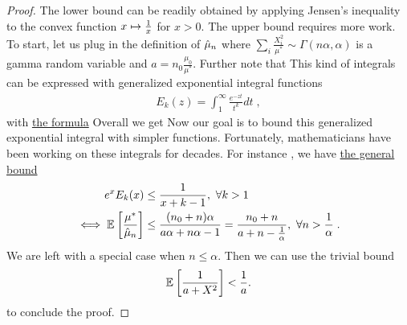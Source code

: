 \begin{proof}
	The lower bound can be readily obtained by applying Jensen's inequality 
	to the convex function $x\mapsto\frac{1}{x}$ for $x>0$.
	The upper bound requires more work.
	To start, let us plug in the definition of $\hat {\mu}_n$
	where  $\sum_i \frac{X_i^2}{ \mu^*} \sim \Gamma(n\alpha, \alpha)$ is a gamma random variable and $a=n_0 \frac{\mu_0}{\mu^*}$. 
	Further note that 
This kind of integrals can be expressed with {generalized exponential integral functions}
	\begin{align}
		E_k(z) = \int_1^\infty \frac{e^{-z t} }{t^k} dt \; ,
	\end{align}
with \href{http://dlmf.nist.gov/8.19.E4}{the formula} \citep[Eq.~8.19.4]{DLMF}
Overall we get
	Now our goal is to bound this generalized exponential integral with simpler functions.
	Fortunately, mathematicians have been working on these integrals for decades.
	For instance , we have \href{https://dlmf.nist.gov/8.19.E21}{the general bound} \citep[Eq.~8.19.21]{DLMF}
	\begin{align}
		e^x E_k(x) 
		&\leq \frac{1}{x + k - 1} , \ \forall k>1\\
		\iff \mathbb{E}_{} \left[ \frac{\mu^*}{\hat {\mu}_n} \right]  
		&\leq \frac{(n_0 +n)\alpha}{a\alpha + n\alpha - 1}
		= \frac{n_0 +n}{a + n - \frac{1}{\alpha}} , \ \forall n >\frac{1}{\alpha} \; .
	\end{align}
We are left with a special case when  $n\leq \alpha$. 
Then we can use the trivial bound 
\begin{align}
	\mathbb{E}_{} \left[ \frac{1}{a + X^2} \right]  < \frac{1}{a}.
	\label{eq:trivial_bound}
\end{align}
to conclude the proof.
\end{proof}

